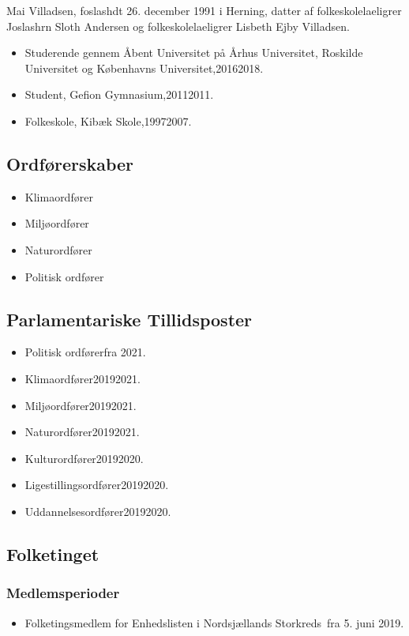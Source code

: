 \documentclass[11pt, a4paper]{awesome-cv}
\begin{document}
\makecvheader[R]
\makelettertitle
\begin{cvletter}
Mai Villadsen, foslashdt 26. december 1991 i Herning, datter af folkeskolelaeligrer Joslashrn Sloth Andersen og folkeskolelaeligrer Lisbeth Ejby Villadsen.

\begin{itemize}
\item Studerende gennem Åbent Universitet på Århus Universitet, Roskilde Universitet og Københavns Universitet,20162018.
\item Student, Gefion Gymnasium,20112011.
\item Folkeskole, Kibæk Skole,19972007.
\end{itemize}
\subsection*{Ordførerskaber}
\begin{itemize}
\item Klimaordfører
\item Miljøordfører
\item Naturordfører
\item Politisk ordfører
\end{itemize}
\subsection*{Parlamentariske Tillidsposter}
\begin{itemize}
\item Politisk ordførerfra 2021.
\item Klimaordfører20192021.
\item Miljøordfører20192021.
\item Naturordfører20192021.
\item Kulturordfører20192020.
\item Ligestillingsordfører20192020.
\item Uddannelsesordfører20192020.
\end{itemize}
\subsection*{Folketinget}
\subsubsection*{Medlemsperioder}
\begin{itemize}
\item Folketingsmedlem for Enhedslisten i Nordsjællands Storkreds fra 5. juni 2019.
\end{itemize}

\end{cvletter}
\end{document}

